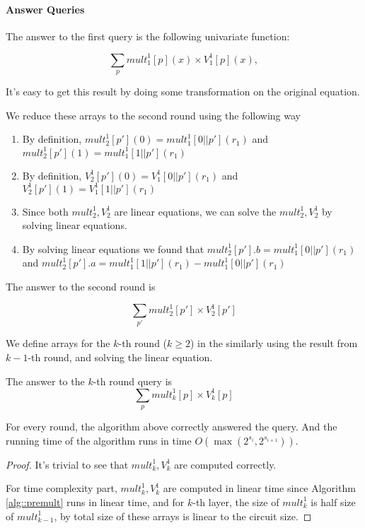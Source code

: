{{{	\paragraph{Answer Queries}
	The answer to the first query is the following univariate function:
	
	$$\sum_{p}{mult}_1^1[p](x)\times{V}_1^1[p](x),$$
	
	It's easy to get this result by doing some transformation on the original equation.
	
	We reduce these arrays to the second round using the following way
	
	\begin{enumerate}
		\item By definition, ${mult}_2^1[p'](0)={mult}_1^1[0||p'](r_1)$ and ${mult}_2^1[p'](1)={mult}_1^1[1||p'](r_1)$
		\item By definition, ${V}_2^1[p'](0)={V}_1^1[0||p'](r_1)$ and ${V}_2^1[p'](1)={V}_1^1[1||p'](r_1)$
		
		\item Since both ${mult}_2^1, {V}_2^1$ are linear equations, we can solve the ${mult}_2^1, {V}_2^1$ by solving linear equations.
		\item By solving linear equations we found that ${mult}_2^1[p'].b={mult}_1^1[0||p'](r_1)$ and ${mult}_2^1[p'].a={mult}_1^1[1||p'](r_1)-{mult}_1^1[0||p'](r_1)$
	\end{enumerate}
	
	The answer to the second round is 
	
	$$\sum_{p'}{mult}_2^1[p']\times{V}_2^1[p']$$
	
	We define arrays for the $k$-th round ($k\ge 2$) in the similarly using the result from $k-1$-th round, and solving the linear equation.
	
	The answer to the $k$-th round query is 
	$$\sum_{p}{mult}_k^1[p]\times{V}_k^1[p]$$
	
	\begin{theorem} For every round, the algorithm above correctly answered the query. And the running time of the algorithm runs in time $O(\max(2^{s_i}, 2^{s_{i+1}}))$.
	\end{theorem}
	
	\begin{proof}
		It's trivial to see that ${mult}_k^1, {V}_k^1$ are computed correctly. 
		
		For time complexity part, ${mult}_k^1, {V}_k^1$ are computed in linear time since Algorithm \ref{alg::premult} runs in linear time, and for $k$-th layer, the size of ${mult}_k^1$ is half size of ${mult}_{k-1}^1$, by total size of these arrays is linear to the circuit size.
		

\end{proof}}}}
